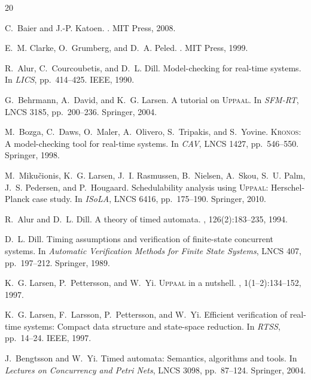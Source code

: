 \documentclass[runningheads]{llncs}
\begin{document}
\begin{thebibliography}{20}

C.~Baier and J.-P. Katoen.
.
\newblock MIT Press, 2008.

E.~M. Clarke, O.~Grumberg, and D.~A. Peled.
.
\newblock MIT Press, 1999.

R.~Alur, C.~Courcoubetis, and D.~L. Dill.
\newblock Model-checking for real-time systems.
\newblock In {\em LICS}, pp.~414--425. IEEE, 1990.

G.~Behrmann, A.~David, and K.~G. Larsen.
\newblock A tutorial on \textsc{Uppaal}.
\newblock In {\em SFM-RT}, LNCS 3185, pp.~200--236. Springer, 2004.

M.~Bozga, C.~Daws, O.~Maler, A.~Olivero, S.~Tripakis, and S.~Yovine.
\newblock \textsc{Kronos}: A model-checking tool for real-time systems.
\newblock In {\em CAV}, LNCS 1427, pp.~546--550. Springer, 1998.

M.~Miku{\v c}ionis, K.~G. Larsen, J.~I. Rasmussen, B.~Nielsen, A.~Skou,
  S.~U. Palm, J.~S. Pedersen, and P.~Hougaard.
\newblock Schedulability analysis using \textsc{Uppaal}: Herschel-Planck case
  study.
\newblock In {\em ISoLA}, LNCS 6416, pp.~175--190. Springer, 2010.

R.~Alur and D.~L. Dill.
\newblock A theory of timed automata.
, 126(2):183--235, 1994.

D.~L. Dill.
\newblock Timing assumptions and verification of finite-state concurrent
  systems.
\newblock In {\em Automatic Verification Methods for Finite State Systems},
  LNCS 407, pp.~197--212. Springer, 1989.

K.~G. Larsen, P.~Pettersson, and W.~Yi.
\newblock \textsc{Uppaal} in a nutshell.
, 1(1--2):134--152, 1997.

K.~G. Larsen, F.~Larsson, P.~Pettersson, and W.~Yi.
\newblock Efficient verification of real-time systems: Compact data structure
  and state-space reduction.
\newblock In {\em RTSS}, pp.~14--24. IEEE, 1997.

J.~Bengtsson and W.~Yi.
\newblock Timed automata: Semantics, algorithms and tools.
\newblock In {\em Lectures on Concurrency and Petri Nets}, LNCS 3098,
  pp.~87--124. Springer, 2004.


\end{thebibliography}
\end{document}
